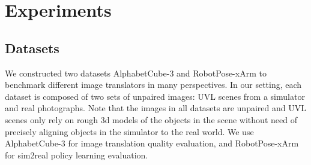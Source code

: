 \documentclass{article}
\begin{document}


\vspace{-8pt}
\section{Experiments}\label{sec:results}
\vspace{-3pt}
\subsection{Datasets}
\label{sec:datasetsresults}
\vspace{-2pt}
We constructed two datasets AlphabetCube-3 and RobotPose-xArm to benchmark different image translators in many perspectives.
In our setting, each dataset is composed of two sets of unpaired images: UVL scenes from a simulator and real photographs.
Note that the images in all datasets are unpaired and UVL scenes only rely on rough 3d models of the objects in the scene without need of precisely aligning objects in the simulator to the real world.
We use AlphabetCube-3 for image translation quality evaluation, and RobotPose-xArm for sim2real policy learning evaluation.



\end{document}

